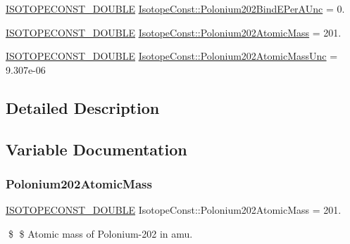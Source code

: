 \begin{DoxyCompactItemize}
\mbox{\hyperlink{group___isotope_const-_macros_ga8f45a7272ce02c0b4c65c44636ed719a}{I\+S\+O\+T\+O\+P\+E\+C\+O\+N\+S\+T\+\_\+\+D\+O\+U\+B\+LE}} \mbox{\hyperlink{group___isotope_const-_polonium-_po202_gaf363aa960a392291a16fc93333d99bfb}{Isotope\+Const\+::\+Polonium202\+Bind\+E\+Per\+A\+Unc}} = 0.
\item 
\mbox{\hyperlink{group___isotope_const-_macros_ga8f45a7272ce02c0b4c65c44636ed719a}{I\+S\+O\+T\+O\+P\+E\+C\+O\+N\+S\+T\+\_\+\+D\+O\+U\+B\+LE}} \mbox{\hyperlink{group___isotope_const-_polonium-_po202_ga48a6d6fcd4b7c2e9f598fe9826f19b73}{Isotope\+Const\+::\+Polonium202\+Atomic\+Mass}} = 201.
\item 
\mbox{\hyperlink{group___isotope_const-_macros_ga8f45a7272ce02c0b4c65c44636ed719a}{I\+S\+O\+T\+O\+P\+E\+C\+O\+N\+S\+T\+\_\+\+D\+O\+U\+B\+LE}} \mbox{\hyperlink{group___isotope_const-_polonium-_po202_ga6110251dcedb6affc6563abf2b0e4ea6}{Isotope\+Const\+::\+Polonium202\+Atomic\+Mass\+Unc}} = 9.\+307e-\/06
\end{DoxyCompactItemize}


\subsection{Detailed Description}


\subsection{Variable Documentation}
\mbox{\label{group___isotope_const-_polonium-_po202_ga48a6d6fcd4b7c2e9f598fe9826f19b73}} 
\subsubsection{\texorpdfstring{Polonium202\+Atomic\+Mass}{Polonium202AtomicMass}}
{\footnotesize\ttfamily \mbox{\hyperlink{group___isotope_const-_macros_ga8f45a7272ce02c0b4c65c44636ed719a}{I\+S\+O\+T\+O\+P\+E\+C\+O\+N\+S\+T\+\_\+\+D\+O\+U\+B\+LE}} Isotope\+Const\+::\+Polonium202\+Atomic\+Mass = 201.}

\$ \$ Atomic mass of Polonium-\/202 in amu. \mbox{\label{group___isotope_const-_polonium-_po202_ga6110251dcedb6affc6563abf2b0e4ea6}} 
